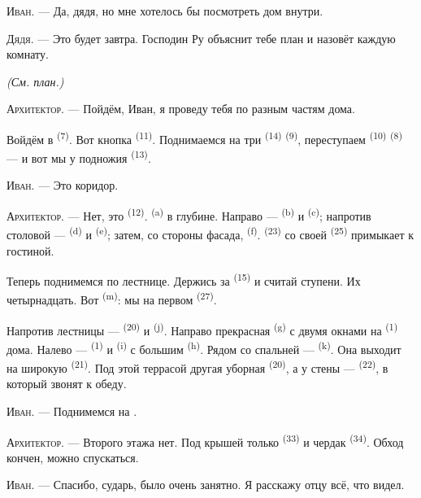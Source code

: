\textsc{Иван}. --- Да, дядя, но мне хотелось бы посмотреть дом внутри.

\textsc{Дядя}. --- Это будет завтра. Господин Ру объяснит тебе план и
назовёт каждую комнату.

\VUsaut{3.0mm}
\VUsaut{2.4mm}

{\centering\textit{(См. план.)}\par}
\VUsaut{2.4mm}

\textsc{Архитектор}. --- Пойдём, Иван, я проведу тебя по разным частям
дома.

Войдём в  \textsuperscript{(7)}. Вот кнопка 
\textsuperscript{(11)}. Поднимаемся на три  \textsuperscript{(14)}
 \textsuperscript{(9)}, переступаем 
\textsuperscript{(10)}  \textsuperscript{(8)} --- и вот мы у
подножия  \textsuperscript{(13)}.

\textsc{Иван}. --- Это коридор.

\textsc{Архитектор}. --- Нет, это  \textsuperscript{(12)}.
 \textsuperscript{(a)} в глубине. Направо --- 
\textsuperscript{(b)} и  \textsuperscript{(c)}; напротив столовой ---
 \textsuperscript{(d)} и  \textsuperscript{(e)}; затем,
со стороны фасада,  \textsuperscript{(f)}. 
\textsuperscript{(23)} со своей  \textsuperscript{(25)}
примыкает к гостиной.

Теперь поднимемся по лестнице. Держись за  \textsuperscript{(15)}
и считай ступени. Их четырнадцать. Вот  \textsuperscript{(m)}:
мы на первом  \textsuperscript{(27)}.

\VUsaut{3.0mm}
\VUsaut{3.0mm}

Напротив лестницы ---  \textsuperscript{(20)} и  \textsuperscript{(j)}. Направо прекрасная 
\textsuperscript{(g)} с двумя окнами на  \textsuperscript{(1)} дома.
Налево ---  \textsuperscript{(1)} и 
\textsuperscript{(i)} с большим  \textsuperscript{(h)}. Рядом со
спальней ---  \textsuperscript{(k)}. Она выходит на широкую
 \textsuperscript{(21)}. Под этой террасой другая уборная
\textsuperscript{(20)}, а у стены ---  \textsuperscript{(22)}, в который
звонят к обеду.

\textsc{Иван}. --- Поднимемся на .

\textsc{Архитектор}. --- Второго этажа нет. Под крышей только
 \textsuperscript{(33)} и чердак \textsuperscript{(34)}. Обход
кончен, можно спускаться.

\textsc{Иван}. --- Спасибо, сударь, было очень занятно. Я расскажу отцу
всё, что видел.
\VUsaut{4.0mm}
\VUfilet{22mm}
